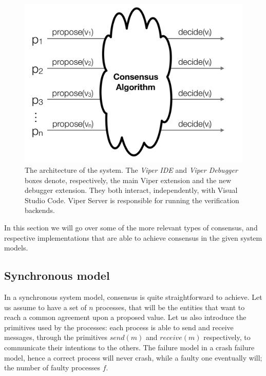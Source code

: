 \begin{figure}[htb]
  \centering
  \includegraphics[width=\textwidth,height=\textheight,keepaspectratio]{img/consensus.png}

  \caption[The architecture of the system]{ The architecture of the system. The
    \textit{Viper IDE} and \textit{Viper Debugger} boxes denote, respectively,
    the main Viper extension and the new debugger extension. They both interact,
    independently, with Visual Studio Code. Viper Server is responsible for
    running the verification backends.}
  \label{fig:consensus}
\end{figure}

In this section we will go over some of the more relevant types of consensus, and respective implementations that are able to achieve consensus in the given system models.


\subsection{Synchronous model}\label{sec:Synchronous model}
In a synchronous system model, consensus is quite straightforward to achieve. Let us assume to have a set of $n$ processes, that will be the entities that want to reach a common agreement upon a proposed value. Let us also introduce the primitives used by the processes: each process is able to send and receive messages, through the primitives $send(m)$ and $receive(m)$ respectively, to communicate their intentions to the others. The failure model in a crash failure model, hence a correct process will never crash, while a faulty one eventually will; the number of faulty processes $f$.


